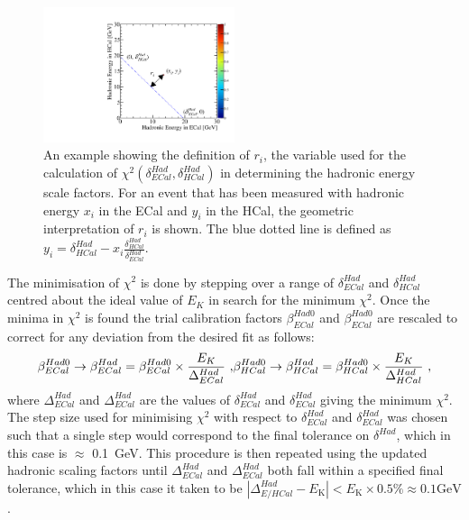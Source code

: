 %
\begin{figure}[h!]
\includegraphics[width=0.5\textwidth]{EnergyEstimators/Plots/Calibration/HadScaleSetting/HadScaleECalHCalSelectionExample.pdf}
\caption[An example showing the definition of $r_{i}$, the variable used for the calculation of $\chi^{2}(\delta^{Had}_{ECal}, \delta^{Had}_{HCal})$ in determining the hadronic energy scale factors.]{An example showing the definition of $r_{i}$, the variable used for the calculation of $\chi^{2}(\delta^{Had}_{ECal}, \delta^{Had}_{HCal})$ in determining the hadronic energy scale factors.  For an event that has been measured with hadronic energy $x_{i}$ in the ECal and $y_{i}$ in the HCal, the geometric interpretation of $r_{i}$ is shown.  The blue dotted line is defined as $y_{i} = \delta^{Had}_{HCal} - x_{i} \frac{\delta^{Had}_{HCal}}{\delta^{Had}_{ECal}}$.}
\label{fig:hadscalechi2calc}
\end{figure}
%
\noindent The minimisation of $\chi^{2}$ is done by stepping over a range of $\delta^{Had}_{ECal}$ and $\delta^{Had}_{HCal}$ centred about the ideal value of $E_{K}$ in search for the minimum $\chi^{2}$.  Once the minima in $\chi^{2}$ is found the trial calibration factors $\beta^{Had0}_{ECal}$ and $\beta^{Had0}_{ECal}$ are rescaled to correct for any deviation from the desired fit as follows:
%
\begin{equation}
\beta^{Had0}_{ECal} \rightarrow \beta^{Had}_{ECal} = \beta^{Had0}_{ECal} \times \frac{E_{K}}{\Delta^{Had}_{ECal}} \text{ ,}\\
\beta^{Had0}_{HCal} \rightarrow \beta^{Had}_{HCal} = \beta^{Had0}_{HCal} \times \frac{E_{K}}{\Delta^{Had}_{HCal}}\text{ ,}
\end{equation}
%
\noindent where $\Delta^{Had}_{ECal}$ and $\Delta^{Had}_{ECal}$ are the values of $\delta^{Had}_{ECal}$ and $\delta^{Had}_{ECal}$ giving the minimum $\chi^{2}$.  The step size used for minimising $\chi^{2}$ with respect to $\delta^{Had}_{ECal}$ and $\delta^{Had}_{ECal}$ was chosen such that a single step would correspond to the final tolerance on $\delta^{Had}$, which in this case is $\approx$ 0.1~GeV.  This procedure is then repeated using the updated hadronic scaling factors until $\Delta^{Had}_{ECal}$ and $\Delta^{Had}_{ECal}$ both fall within a specified final tolerance, which in this case it taken to be $|\Delta^{Had}_{E/HCal} - E_{\text{{K}}}| < E_{\text{{K}}} \times 0.5 \% \approx 0.1 \text{GeV}$.

